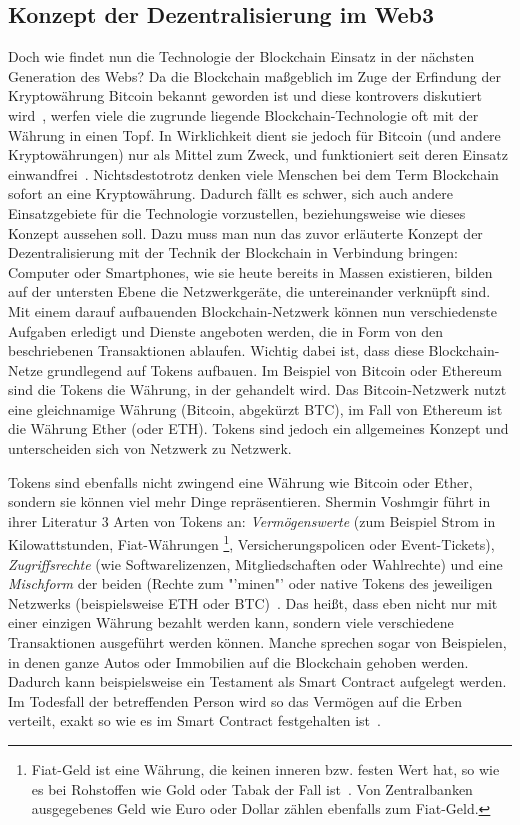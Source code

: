 \subsection{Konzept der Dezentralisierung im Web3}

Doch wie findet nun die Technologie der Blockchain Einsatz in der nächsten Generation des Webs? Da die Blockchain maßgeblich im Zuge der Erfindung der Kryptowährung Bitcoin bekannt geworden ist und diese kontrovers diskutiert wird~\cite{Crosby.2016}, werfen viele die zugrunde liegende Blockchain-Technologie oft mit der Währung in einen Topf. In Wirklichkeit dient sie jedoch für Bitcoin (und andere Kryptowährungen) nur als Mittel zum Zweck, und funktioniert seit deren Einsatz einwandfrei~\cite{Crosby.2016}.
Nichtsdestotrotz denken viele Menschen bei dem Term Blockchain sofort an eine Kryptowährung. Dadurch fällt es schwer, sich auch andere Einsatzgebiete für die Technologie vorzustellen, beziehungsweise wie dieses Konzept aussehen soll. Dazu muss man nun das zuvor erläuterte Konzept der Dezentralisierung mit der Technik der Blockchain in Verbindung bringen: Computer oder Smartphones, wie sie heute bereits in Massen existieren, bilden auf der untersten Ebene die Netzwerkgeräte, die untereinander verknüpft sind. Mit einem darauf aufbauenden Blockchain-Netzwerk können nun verschiedenste Aufgaben erledigt und Dienste angeboten werden, die in Form von den beschriebenen Transaktionen ablaufen. Wichtig dabei ist, dass diese Blockchain-Netze grundlegend auf Tokens aufbauen. Im Beispiel von Bitcoin oder Ethereum sind die Tokens die Währung, in der gehandelt wird. 
Das Bitcoin-Netzwerk nutzt eine gleichnamige Währung (Bitcoin, abgekürzt BTC), im Fall von Ethereum ist die Währung Ether (oder ETH). Tokens sind jedoch ein allgemeines Konzept und unterscheiden sich von Netzwerk zu Netzwerk. 

Tokens sind ebenfalls nicht zwingend eine Währung wie Bitcoin oder Ether, sondern sie können viel mehr Dinge repräsentieren. 
Shermin Voshmgir führt in ihrer Literatur 3 Arten von Tokens an: \textit{Vermögenswerte} (zum Beispiel Strom in Kilowattstunden, Fiat-Währungen
\footnote{
	Fiat-Geld ist eine Währung, die keinen inneren bzw. festen Wert hat, so wie es bei Rohstoffen wie Gold oder Tabak der Fall ist~\cite{CAPinside.2018}. Von Zentralbanken ausgegebenes Geld wie Euro oder Dollar zählen ebenfalls zum Fiat-Geld. 
}, 
Versicherungspolicen oder Event-Tickets), \textit{Zugriffsrechte} (wie Softwarelizenzen, Mitgliedschaften oder Wahlrechte) und eine \textit{Mischform} der beiden (Rechte zum "'minen"' oder native Tokens des jeweiligen Netzwerks (beispielsweise ETH oder BTC)~\cite[S. 151]{Voshmgir.2019}.
Das heißt, dass eben nicht nur mit einer einzigen Währung bezahlt werden kann, sondern viele verschiedene Transaktionen ausgeführt werden können. Manche sprechen sogar von Beispielen, in denen ganze Autos oder Immobilien auf die Blockchain gehoben werden. Dadurch kann beispielsweise ein Testament als Smart Contract aufgelegt werden. Im Todesfall der betreffenden Person wird so das Vermögen auf die Erben verteilt, exakt so wie es im Smart Contract festgehalten ist~\cite[02:10]{Krypto.2018}. 

